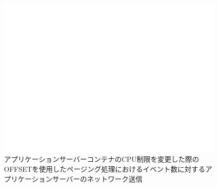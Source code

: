 \documentclass[../../../../../main]{subfiles}
\begin{document}
    \begin{figure}[H]
        \centering
        \includegraphics[width=12cm]{graph}
        \caption{アプリケーションサーバーコンテナのCPU制限を変更した際のOFFSETを使用したページング処理におけるイベント数に対するアプリケーションサーバーのネットワーク送信}
        \label{fig:paging-offset-change-app-cpu-limit-app-net-out-app_1024-db_1_1024}
    \end{figure}
\end{document}
